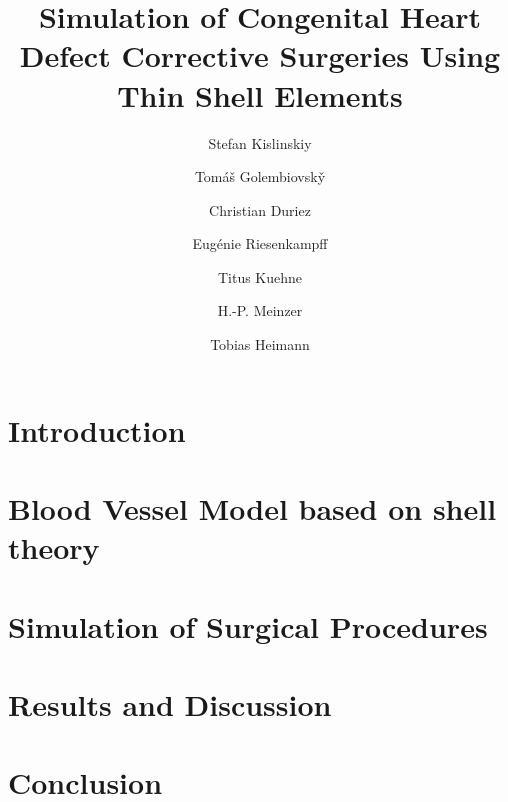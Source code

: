 \documentclass[runningheads,a4paper]{llncs}
\begin{document}
\mainmatter            %

\title{Simulation of Congenital Heart Defect Corrective Surgeries Using Thin Shell Elements}

\author{Stefan Kislinskiy
\and Tom\'{a}\v{s} Golembiovsk\v{y}
\and Christian Duriez
\and Eug\'{e}nie Riesenkampff
\and Titus Kuehne
\and H.-P. Meinzer
\and Tobias Heimann}


\maketitle

\begin{abstract}

\end{abstract}

\section{Introduction}
 

\section{Blood Vessel Model based on shell theory}


\section{Simulation of Surgical Procedures}
\label{sec-method}


\section{Results and Discussion}


\section{Conclusion}

\end{document}
